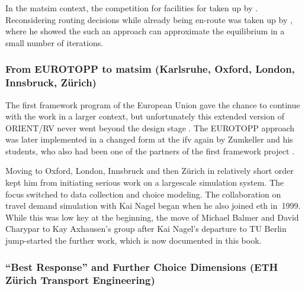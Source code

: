 In the \gls{matsim} context, the competition for facilities for taken up by \citep[][]{HorniEtAl_TRR_2009}.  Reconsidering routing decisions while already being en-route was taken up by \citet[][]{Dobler_PhDThesis_2013}, where he showed the such an approach can approximate the equilibrium in a small number of iterations.

\subsubsection{From EUROTOPP to \gls{matsim} (Karlsruhe, Oxford, London, Innsbruck, Zürich)}


The  first framework program of the European Union gave the chance to continue with the work in a larger context, but unfortunately this extended version of ORIENT/RV never went beyond the design stage \citep[][]{AxhausenGoodwin1991}. The EUROTOPP approach was later implemented in a changed form at the \gls{ifv} again by Zumkeller and his students, who also had been one of the partners of the first framework project \citep[][]{SchnittgerZumkeller_ETC_2004}.

Moving to Oxford, London, Innsbruck and then Zürich in relatively short order kept him from initiating serious work on a \gls{largescale} simulation system. 
The focus switched to data collection and choice modeling. 
The collaboration on travel demand simulation with Kai Nagel began when he also joined \gls{eth} in~1999. 
While this was low key at the beginning, the move of Michael Balmer and David Charypar to Kay Axhausen's group after Kai Nagel's departure to TU Berlin jump-started the further work, which is now documented in %
this book.


\subsubsection{``Best Response'' and Further Choice Dimensions (ETH Zürich Transport Engineering)}
\label{sec:zhgroup_matsim}

